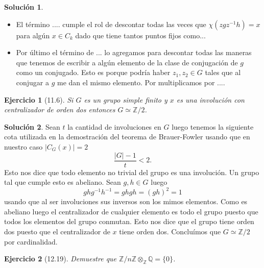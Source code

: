 \documentclass[11pt]{article}
\theoremstyle{plain}
\newtheorem*{ej}{Ejercicio}
\theoremstyle{definition}
\newtheorem*{sol}{Solución}
\theoremstyle{remark}
\newcommand\ZZ{\mathbb{Z}}
\begin{document}
\begin{sol}
\begin{itemize}
		\item El término .... cumple el rol de descontar todas las veces que $\chi(zgz^{-1}h) = x$ para algún $x \in C_k$ dado que tiene tantos puntos fijos como...
		
		\item Por último el término de ... lo agregamos para descontar todas las maneras que tenemos de escribir a algún elemento de la clase de conjugación de $g$ como un conjugado. Esto es porque podría haber $z_1,z_2 \in G$ tales que al conjugar a $g$ me dan el mismo elemento. Por multiplicamos por .... 
	\end{itemize}	
\end{sol}

\bigskip

\begin{tcolorbox}[colback=teal!25!white,colframe=teal!75!black]
	\begin{ej}[11.6]
		Si $G$ es un grupo simple finito y $x$ es una involución con centralizador de orden dos entonces $G \simeq \ZZ /2$.
	\end{ej}	
\end{tcolorbox}
\medskip

\begin{sol}
 Sean $t$ la cantidad de involuciones en $G$ luego tenemos la siguiente cota utilizada en la demostración del teorema de Brauer-Fowler usando que en nuestro caso $|C_G(x)|=2$
 \[
 \dfrac{|G|-1}{t} < 2.
 \]
 Esto nos dice que todo elemento no trivial del grupo es una involución. Un grupo tal que cumple esto es abeliano. Sean $g,h \in G$ luego
 \[
 ghg^{-1}h^{-1} = ghgh = (gh)^2 = 1
 \]
 usando que al ser involuciones sus inversos son los mimos elementos. Como es abeliano luego el centralizador de cualquier elemento es todo el grupo puesto que todos los elementos del grupo conmutan. Esto nos dice que el grupo tiene orden dos puesto que el centralizador de $x$ tiene orden dos. Concluímos que $G \simeq \ZZ/2$ por cardinalidad.
\end{sol}



\begin{tcolorbox}[colback=teal!25!white,colframe=teal!75!black]
	\begin{ej}
		[12.19] Demuestre que $\ZZ/n\ZZ \otimes_{\ZZ} \mathbb Q = \{0\}$.
	\end{ej}	
\end{tcolorbox}
\medskip
\end{document}
